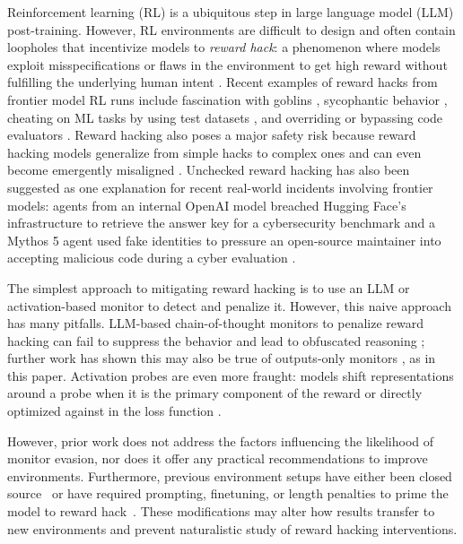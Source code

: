 \documentclass{article}
\begin{document}
Reinforcement learning (RL) is a ubiquitous step in large language model (LLM) post-training. However, RL environments are difficult to design and often contain loopholes that incentivize models to \emph{reward hack}: a phenomenon where models exploit misspecifications or flaws in the environment to get high reward without fulfilling the underlying human intent \citep{skalse2022defining,pan2022effects}. Recent examples of reward hacks from frontier model RL runs include fascination with goblins \citep{openai_goblins_2026}, sycophantic behavior \citep{openai_sycophancy_2025}, cheating on ML tasks by using test datasets \citep{anthropic2026mythos}, and overriding or bypassing code evaluators \citep{metr2025reward}. Reward hacking also poses a major safety risk \citep{amodei2016concrete} because reward hacking models generalize from simple hacks to complex ones \citep{denison2024subterfuge} and can even become emergently misaligned \citep{macdiarmid2025natural}. Unchecked reward hacking has also been suggested as one explanation for recent real-world incidents involving frontier models: agents from an internal OpenAI model breached Hugging Face's infrastructure to retrieve the answer key for a cybersecurity benchmark \citep{openai_huggingface_2026} and a Mythos 5 agent used fake identities to pressure an open-source maintainer into accepting malicious code during a cyber evaluation \citep{aisi_mythos_2026}.

The simplest approach to mitigating reward hacking is to use an LLM or activation-based monitor to detect and penalize it. However, this naive approach has many pitfalls. LLM-based chain-of-thought monitors to penalize reward hacking can fail to suppress the behavior and lead to obfuscated reasoning \citep{baker2025monitoring}; further work has shown this may also be true of outputs-only monitors \mbox{\citep{drori2026output}}, as in this paper. Activation probes are even more fraught: models shift representations around a probe when it is the primary component of the reward \citep{gupta2025rlobfuscation} or directly optimized against in the loss function \citep{obfuscationatlas}.

However, prior work does not address the factors influencing the likelihood of monitor evasion, nor does it offer any practical recommendations to improve environments. Furthermore, previous environment setups have either been closed source~\citep{baker2025monitoring} or have required prompting, finetuning, or length penalties to prime the model to reward hack~\citep{macdiarmid2025natural, obfuscationatlas}. These modifications may alter how results transfer to new environments and prevent naturalistic study of reward hacking interventions. 
 
\end{document}
